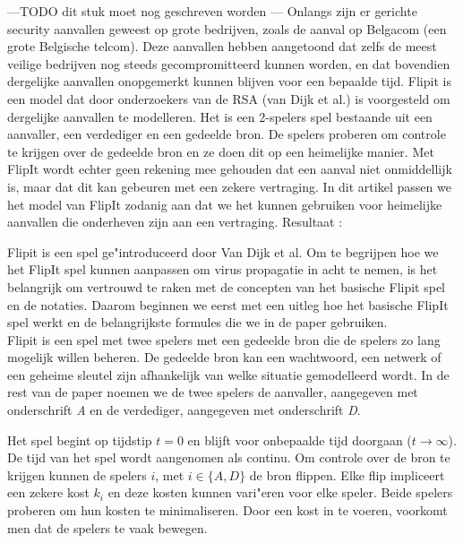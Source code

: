 \documentclass[master=cws, masteroption=vs]{kulemt}
\begin{document}
\begin{abstract*}
---TODO dit stuk moet nog geschreven worden ---
Onlangs zijn er gerichte security aanvallen geweest op grote bedrijven, zoals de aanval op Belgacom (een grote Belgische telcom). Deze aanvallen hebben aangetoond dat zelfs de meest veilige
bedrijven nog steeds gecompromitteerd kunnen worden, en dat bovendien dergelijke aanvallen onopgemerkt kunnen blijven voor een bepaalde tijd.
Flipit is een model dat door onderzoekers van de RSA (van Dijk et al.) is voorgesteld om dergelijke aanvallen te modelleren. Het is een 2-spelers spel bestaande uit een aanvaller, een verdediger en een gedeelde bron.  De spelers proberen om controle te krijgen over de gedeelde bron en ze
doen dit op een heimelijke manier. Met FlipIt wordt echter geen rekening mee gehouden dat een aanval niet onmiddellijk is, maar dat dit kan gebeuren met een zekere vertraging. In dit artikel passen we het model van FlipIt zodanig aan dat we het kunnen gebruiken voor heimelijke aanvallen die onderheven zijn aan een vertraging.
Resultaat :

Flipit is een spel ge"introduceerd door Van Dijk et al. Om te begrijpen hoe we het FlipIt spel kunnen aanpassen om virus propagatie in acht te nemen, is het belangrijk om vertrouwd te raken met de concepten van het basische Flipit spel en de notaties. Daarom beginnen we eerst met een uitleg hoe het basische FlipIt spel werkt en de belangrijkste formules die we in de paper gebruiken. \\

Flipit is een spel met twee spelers met een gedeelde bron die de spelers zo lang mogelijk willen beheren. De gedeelde bron kan een wachtwoord, een netwerk of een geheime sleutel zijn afhankelijk van welke situatie gemodelleerd wordt. In de rest van de paper noemen we de twee spelers de aanvaller, aangegeven met onderschrift  \textit{A} en de verdediger, aangegeven met onderschrift \textit{D}.

Het spel begint op tijdstip $ t = 0 $ en blijft voor onbepaalde tijd doorgaan ($ t \rightarrow \infty $). De tijd van het spel wordt aangenomen als continu. Om controle over de bron te krijgen kunnen de spelers $i$, met $ i \in \{A, D \} $ de bron flippen. Elke flip impliceert een zekere kost $ k_{i} $ en deze kosten kunnen vari"eren voor elke speler. Beide spelers proberen om hun kosten te minimaliseren. Door een kost in te voeren, voorkomt men dat de spelers te vaak bewegen. \\


\end{abstract*}
\end{document}
